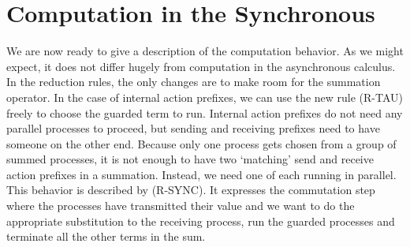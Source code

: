 \section{Computation in the Synchronous \Picalc}
We are now ready to give a description of the computation behavior.  
As we might expect, it does not differ hugely from computation in the asynchronous calculus.  
In the reduction rules, the only changes are to make room for the summation operator.
In the case of internal action prefixes, we can use the new rule (R-TAU) freely to choose the guarded term to run.
Internal action prefixes do not need any parallel processes to proceed, but sending and receiving prefixes need to have someone on the other end.
Because only one process gets chosen from a group of summed processes, it is not enough to have two `matching' send and receive action prefixes in a summation.
Instead, we need one of each running in parallel.  This behavior is described by (R-SYNC).  
It expresses the commutation step where the processes have transmitted their value and we want to do the appropriate substitution to the receiving process, run the guarded processes and terminate all the other terms in the sum.

